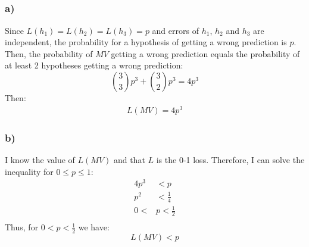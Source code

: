 \documentclass[a4paper]{article}
\begin{document}
\subsection{}
\label{subsec:23}
\subsubsection*{a)}
Since $L(h_1) = L(h_2) = L(h_3) = p$ and errors of $h_1$, $h_2$ and $h_3$ are
independent, the probability for a hypothesis of getting a wrong prediction is
$p$. Then, the probability of $MV$ getting a wrong prediction equals the
probability of at least 2 hypotheses getting a wrong prediction:
\[
\binom{3}{3}p^3 + \binom{3}{2}p^3 = 4p^3
\]
Then:
\begin{align*}
  L(MV) = 4p^3
\end{align*}

\subsubsection*{b)}
I know the value of $L(MV)$ and that $L$ is the 0-1 loss. 
Therefore, I can solve the inequality for $0 \leq p \leq  1$:
\begin{align*}
  4p^3 &< p\\
  p^2 &< \frac{1}{4}\\
  0 < &p < \frac{1}{2}\\
\end{align*}
Thus, for $0 < p < \frac{1}{2}$ we have:
\[
L(MV) < p
\]
\end{document}

